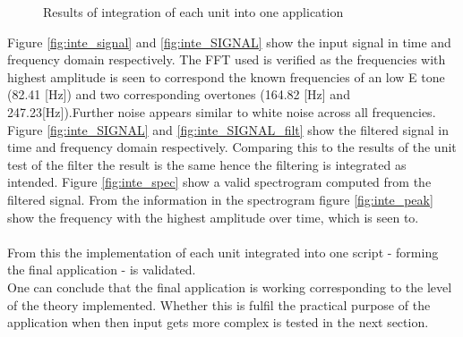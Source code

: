 \begin{figure}[H]
\begin{subfigure}{0.49\textwidth}
\end{subfigure}
\caption{Results of integration of each unit into one application }
\label{fig:inte_validation}
\end{figure}
Figure \ref{fig:inte_signal} and \ref{fig:inte_SIGNAL} show the input signal in time and frequency domain respectively. The FFT used is verified as the frequencies with highest amplitude is seen to correspond the known frequencies of an low E tone (82.41 [Hz]) and two corresponding overtones (164.82 [Hz] and 247.23[Hz]).Further noise appears similar to white noise across all frequencies.\\
Figure \ref{fig:inte_SIGNAL} and \ref{fig:inte_SIGNAL_filt} show the filtered signal in time and frequency domain respectively. Comparing this to the results of the unit test of the filter the result is the same hence the filtering is integrated as intended. Figure \ref{fig:inte_spec} show a valid spectrogram computed from the filtered signal. From the information in the spectrogram figure \ref{fig:inte_peak} show the frequency with the highest amplitude over time, which is seen to.\\
\\
From this the implementation of each unit integrated into one script - forming the final application - is validated. \\
One can conclude that the final application is working corresponding to the level of the theory implemented. Whether this is fulfil the practical purpose of the application when then input gets more complex is tested in the next section.              